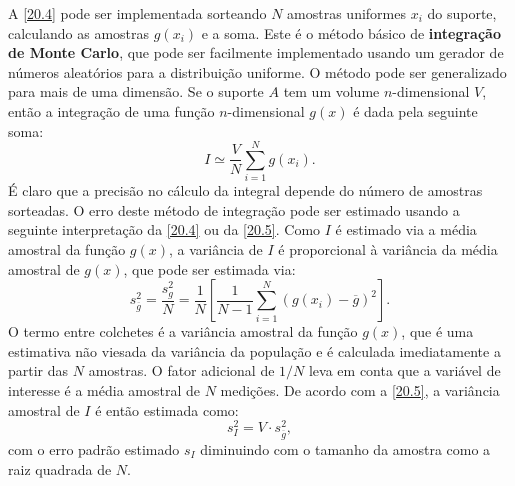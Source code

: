 A \autoref{20.4} pode ser implementada sorteando $ N $ amostras uniformes $ x_i $ do suporte, calculando as amostras $ g(x_i) $ e a soma. Este é o método básico de \textbf{integração de Monte Carlo}, que pode ser facilmente implementado usando um gerador de números aleatórios para a distribuição uniforme. O método pode ser generalizado para mais de uma dimensão. Se o suporte $ A $ tem um volume $n$-dimensional $ V $, então a integração de uma função $n$-dimensional $ g(x) $ é dada pela seguinte soma:
\begin{equation}\label{20.5}
I \simeq \dfrac{V}{N} \sum_{i=1}^N g(x_i).
\end{equation}
É claro que a precisão no cálculo da integral depende do número de amostras sorteadas. O erro deste método de integração pode ser estimado usando a seguinte interpretação da \autoref{20.4} ou da \autoref{20.5}. Como $ I $ é estimado via a média amostral da função $ g(x) $, a variância de $ I $ é proporcional à variância da média amostral de $ g(x) $, que pode ser estimada via:
\begin{equation*}
s_{\overline{g}}^2 = \dfrac{s_g^2}{N} = \dfrac{1}{N}\left[\dfrac{1}{N-1} \sum_{i=1}^N(g(x_i) - \overline{g})^2\right].
\end{equation*}
O termo entre colchetes é a variância amostral da função $ g(x) $, que é uma estimativa não viesada da variância da população e é calculada imediatamente a partir das $ N $ amostras. O fator adicional de $ 1/N $ leva em conta que a variável de interesse é a média amostral de $ N $ medições. De acordo com a \autoref{20.5}, a variância amostral de $ I $ é então estimada como:
\begin{equation}
s_I^2 = V \cdot s_{\overline{g}}^2,
\end{equation}
com o erro padrão estimado $ s_I $ diminuindo com o tamanho da amostra como a raiz quadrada de $ N $.

